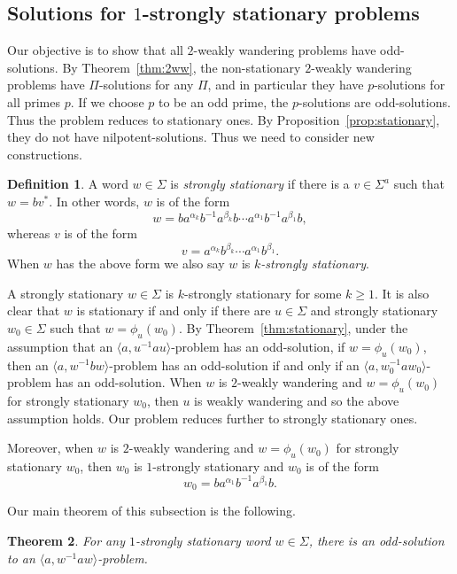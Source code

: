 \documentclass[10pt,a4paper]{amsart}
\newtheorem{theorem}{Theorem}[section]
\theoremstyle{definition}
\newtheorem{definition}[theorem]{Definition}
\theoremstyle{definition}
\numberwithin{equation}{section}
\begin{document}
\subsection{Solutions for $1$-strongly stationary problems\label{subsec:1ss}}

Our objective is to show that all $2$-weakly wandering problems have odd-solutions. By Theorem~\ref{thm:2ww}, the non-stationary $2$-weakly wandering problems have $\Pi$-solutions for any $\Pi$, and in particular they have $p$-solutions for all primes $p$. If we choose $p$ to be an odd prime, the $p$-solutions are odd-solutions. Thus the problem reduces to stationary ones. By Proposition~\ref{prop:stationary}, they do not have nilpotent-solutions. Thus we need to consider new constructions.

\begin{definition} A word $w\in \Sigma$ is {\em strongly stationary} if there is a $v\in \Sigma^a$ such that $w=bv^*$. In other words, $w$ is of the form
$$ w=ba^{\alpha_k}b^{-1}a^{\beta_k}b\cdots a^{\alpha_1}b^{-1}a^{\beta_1}b, $$
whereas $v$ is of the form
$$ v=a^{\alpha_k}b^{\beta_k}\cdots a^{\alpha_1}b^{\beta_1}. $$
When $w$ has the above form we also say $w$ is {\em $k$-strongly stationary}.
\end{definition}

A strongly stationary $w\in \Sigma$ is $k$-strongly stationary for some $k\geq 1$. It is also clear that $w$ is stationary if and only if there are $u\in \Sigma$ and strongly stationary $w_0\in\Sigma$ such that $w=\phi_u(w_0)$.  By Theorem~\ref{thm:stationary}, under the assumption that an $\langle a, u^{-1}au\rangle$-problem has an odd-solution, if $w=\phi_u(w_0)$, then an $\langle a, w^{-1}bw\rangle$-problem has an odd-solution if and only if an $\langle a, w_0^{-1}aw_0\rangle$-problem has an odd-solution. 
When $w$ is $2$-weakly wandering and $w=\phi_u(w_0)$ for strongly stationary $w_0$, then $u$ is weakly wandering and so the above assumption holds. Our problem reduces further to strongly stationary ones.

Moreover, when $w$ is $2$-weakly wandering and $w=\phi_u(w_0)$ for strongly stationary $w_0$, then $w_0$ is $1$-strongly stationary and $w_0$ is of the form
$$ w_0=ba^{\alpha_1}b^{-1}a^{\beta_1}b. $$

Our main theorem of this subsection is the following.

\begin{theorem}\label{thm:1ss} For any $1$-strongly stationary word $w\in \Sigma$, there is an odd-solution to an $\langle a, w^{-1}aw\rangle$-problem.
\end{theorem}
\end{document}
